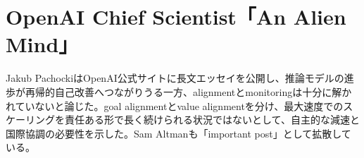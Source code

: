 \section{OpenAI Chief Scientist「An Alien Mind」}
Jakub PachockiはOpenAI公式サイトに長文エッセイを公開し、推論モデルの進歩が再帰的自己改善へつながりうる一方、alignmentとmonitoringは十分に解かれていないと論じた。goal alignmentとvalue alignmentを分け、最大速度でのスケーリングを責任ある形で長く続けられる状況ではないとして、自主的な減速と国際協調の必要性を示した。Sam Altmanも「important post」として拡散している。
